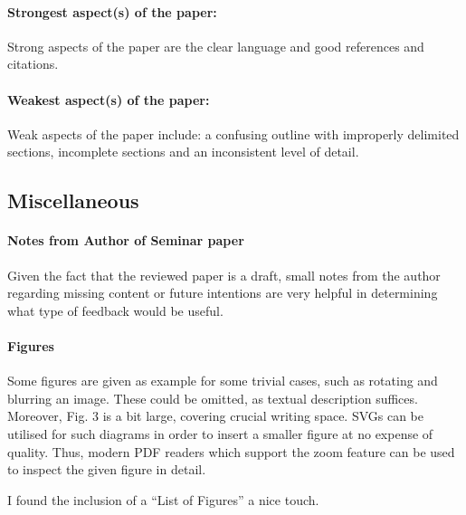 \documentclass[12pt]{scrartcl}
\begin{document}
\paragraph{Strongest aspect(s) of the paper:} Strong aspects of the paper are the
clear language and good references and citations.

\paragraph{Weakest aspect(s) of the paper:} Weak aspects of the paper include: 
a confusing outline with improperly delimited sections, incomplete sections and an inconsistent level of detail.

\subsection*{Miscellaneous}

\paragraph{Notes from Author of Seminar paper} Given the fact that the
reviewed paper is a draft, small notes from the author regarding missing
content or future intentions are very helpful in determining what type of feedback would be useful.

\paragraph{Figures} Some figures are given as example for some trivial cases,
such as rotating and blurring an image. These could be omitted, as textual
description suffices. Moreover, Fig. 3 is a bit large, covering crucial writing
space. SVGs can be utilised for such diagrams in order to insert a smaller
figure at no expense of quality. Thus, modern PDF readers which support the
zoom feature can be used to inspect the given figure in detail. 

I found the inclusion of a ``List of Figures'' a nice touch.
\end{document}
